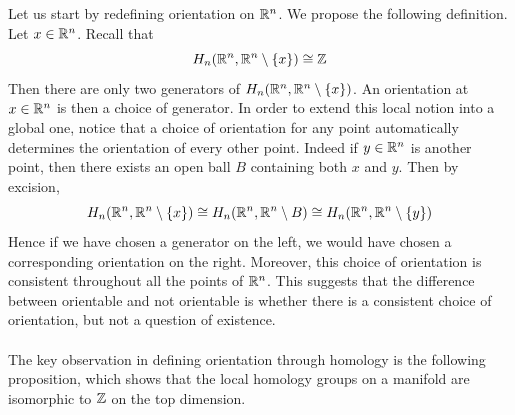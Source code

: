 \documentclass[a4paper]{article}
\begin{document}
Let us start by redefining orientation on $\mathbb{R}^n$. We propose the following definition. Let $x\in\mathbb{R}^n$. Recall that $$H_n(\mathbb{R}^n,\mathbb{R}^n\setminus\{x\})\cong\mathbb{Z}$$ Then there are only two generators of $H_n(\mathbb{R}^n,\mathbb{R}^n\setminus\{x\})$. An orientation at $x\in\mathbb{R}^n$ is then a choice of generator. In order to extend this local notion into a global one, notice that a choice of orientation for any point automatically determines the orientation of every other point. Indeed if $y\in\mathbb{R}^n$ is another point, then there exists an open ball $B$ containing both $x$ and $y$. Then by excision, $$H_n(\mathbb{R}^n,\mathbb{R}^n\setminus\{x\})\cong H_n(\mathbb{R}^n,\mathbb{R}^n\setminus B)\cong H_n(\mathbb{R}^n,\mathbb{R}^n\setminus\{y\})$$ Hence if we have chosen a generator on the left, we would have chosen a corresponding orientation on the right. Moreover, this choice of orientation is consistent throughout all the points of $\mathbb{R}^n$. This suggests that the difference between orientable and not orientable is whether there is a consistent choice of orientation, but not a question of existence. \\~\\

The key observation in defining orientation through homology is the following proposition, which shows that the local homology groups on a manifold are isomorphic to $\mathbb{Z}$ on the top dimension. 
\end{document}
